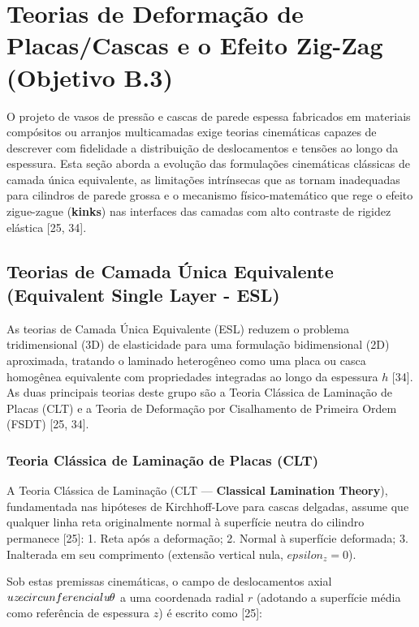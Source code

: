 \section{Teorias de Deformação de Placas/Cascas e o Efeito Zig-Zag (Objetivo B.3)}

O projeto de vasos de pressão e cascas de parede espessa fabricados em materiais compósitos ou arranjos multicamadas exige teorias cinemáticas capazes de descrever com fidelidade a distribuição de deslocamentos e tensões ao longo da espessura. Esta seção aborda a evolução das formulações cinemáticas clássicas de camada única equivalente, as limitações intrínsecas que as tornam inadequadas para cilindros de parede grossa e o mecanismo físico-matemático que rege o efeito zigue-zague (\textbf{kinks}) nas interfaces das camadas com alto contraste de rigidez elástica [25, 34].

\subsection{Teorias de Camada Única Equivalente (Equivalent Single Layer - ESL)}

As teorias de Camada Única Equivalente (ESL) reduzem o problema tridimensional (3D) de elasticidade para uma formulação bidimensional (2D) aproximada, tratando o laminado heterogêneo como uma placa ou casca homogênea equivalente com propriedades integradas ao longo da espessura $h$ [34]. As duas principais teorias deste grupo são a Teoria Clássica de Laminação de Placas (CLT) e a Teoria de Deformação por Cisalhamento de Primeira Ordem (FSDT) [25, 34].

\subsubsection{Teoria Clássica de Laminação de Placas (CLT)}

A Teoria Clássica de Laminação (CLT — \textbf{Classical Lamination Theory}), fundamentada nas hipóteses de Kirchhoff-Love para cascas delgadas, assume que qualquer linha reta originalmente normal à superfície neutra do cilindro permanece [25]:
1. Reta após a deformação;
2. Normal à superfície deformada;
3. Inalterada em seu comprimento (extensão vertical nula, $epsilon_z = 0$).

Sob estas premissas cinemáticas, o campo de deslocamentos axial $u\textit{z$ e circunferencial $u}\theta$ a uma coordenada radial $r$ (adotando a superfície média como referência de espessura $z$) é escrito como [25]:

